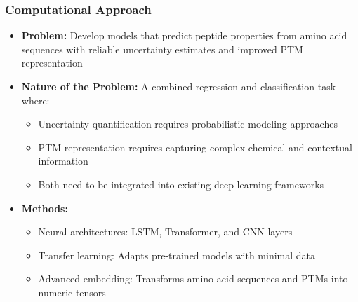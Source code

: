 \documentclass{beamer}
\begin{document}
\begin{frame}
  \frametitle{Computational Approach}
  \begin{itemize}
    \item \textbf{Problem:} Develop models that predict peptide properties from amino acid sequences with reliable uncertainty estimates and improved PTM representation
    \item \textbf{Nature of the Problem:} A combined regression and classification task where:
    \begin{itemize}
      \item Uncertainty quantification requires probabilistic modeling approaches
      \item PTM representation requires capturing complex chemical and contextual information
      \item Both need to be integrated into existing deep learning frameworks
    \end{itemize}
    \item \textbf{Methods:}
    \begin{itemize}
      \item Neural architectures: LSTM, Transformer, and CNN layers
      \item Transfer learning: Adapts pre-trained models with minimal data
      \item Advanced embedding: Transforms amino acid sequences and PTMs into numeric tensors
    \end{itemize}
  \end{itemize}
\end{frame}
\end{document}
